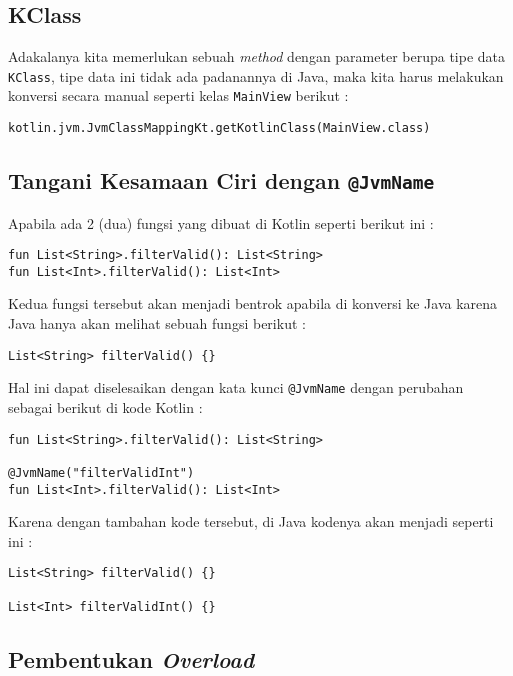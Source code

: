 \subsection{KClass}

Adakalanya kita memerlukan sebuah \textit{method} dengan parameter berupa tipe data \texttt{KClass}, tipe data ini tidak ada padanannya di Java, maka kita harus melakukan konversi secara manual seperti kelas \texttt{MainView} berikut :

\begin{lstlisting}
kotlin.jvm.JvmClassMappingKt.getKotlinClass(MainView.class)
\end{lstlisting}

\subsection{Tangani Kesamaan Ciri dengan \texttt{@JvmName}}

Apabila ada 2 (dua) fungsi yang dibuat di Kotlin seperti berikut ini :

\begin{lstlisting}
fun List<String>.filterValid(): List<String>
fun List<Int>.filterValid(): List<Int>
\end{lstlisting}

Kedua fungsi tersebut akan menjadi bentrok apabila di konversi ke Java karena Java hanya akan melihat sebuah fungsi berikut :

\begin{lstlisting}
List<String> filterValid() {}
\end{lstlisting}

Hal ini dapat diselesaikan dengan kata kunci \texttt{@JvmName} dengan perubahan sebagai berikut di kode Kotlin :

\begin{lstlisting}
fun List<String>.filterValid(): List<String>

@JvmName("filterValidInt")
fun List<Int>.filterValid(): List<Int>
\end{lstlisting}

Karena dengan tambahan kode tersebut, di Java kodenya akan menjadi seperti ini :

\begin{lstlisting}
List<String> filterValid() {}

List<Int> filterValidInt() {}
\end{lstlisting}

\subsection{Pembentukan \textit{Overload}}

